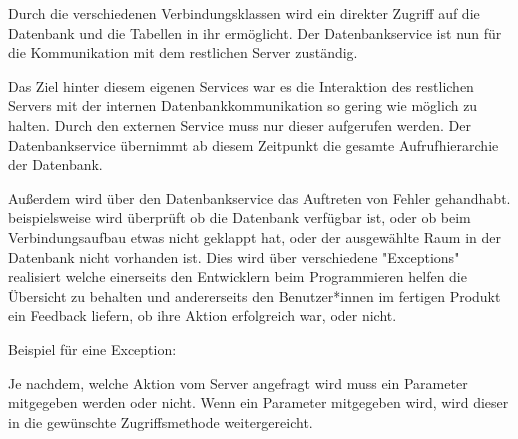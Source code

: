 
Durch die verschiedenen Verbindungsklassen wird ein direkter Zugriff auf die Datenbank und die Tabellen in ihr ermöglicht. Der Datenbankservice ist nun für die Kommunikation mit dem restlichen Server zuständig. 

Das Ziel hinter diesem eigenen Services war es die Interaktion des restlichen Servers mit der internen Datenbankkommunikation so gering wie möglich zu halten. Durch den externen Service muss nur dieser aufgerufen werden. Der Datenbankservice übernimmt ab diesem Zeitpunkt die gesamte Aufrufhierarchie der Datenbank.

Außerdem wird über den Datenbankservice das Auftreten von Fehler gehandhabt. beispielsweise wird überprüft ob die Datenbank verfügbar ist, oder ob beim Verbindungsaufbau etwas nicht geklappt hat, oder der ausgewählte Raum in der Datenbank nicht vorhanden ist. Dies wird über verschiedene "Exceptions" realisiert welche einerseits den Entwicklern beim Programmieren helfen die Übersicht zu behalten und andererseits den Benutzer*innen im fertigen Produkt ein Feedback liefern, ob ihre Aktion erfolgreich war, oder nicht.

Beispiel für eine Exception:


Je nachdem, welche Aktion vom Server angefragt wird muss ein Parameter mitgegeben werden oder nicht. Wenn ein Parameter mitgegeben wird, wird dieser in die gewünschte Zugriffsmethode weitergereicht.

